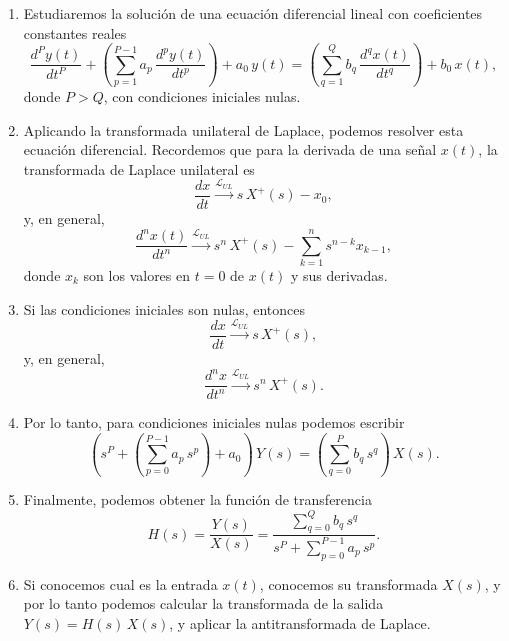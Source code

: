 \begin{enumerate}
	\item Estudiaremos la soluci\'{o}n de una ecuaci\'{o}n diferencial lineal con coeficientes constantes reales
	\begin{equation}
		\frac{d^{P}y\left( t\right) }{dt^{P}} +
		\left(\sum_{p=1}^{P-1}a_{p} \, \frac{d^{p}y\left( t\right) }{dt^{p}}\right) + a_{0} \, y(t)= 
		\left(\sum_{q=1}^{Q}b_{q} \, \frac{d^{q}x\left( t\right) }{dt^{q}}\right)  + b_{0} \, x(t),
	\end{equation}
	donde $P > Q$, con condiciones iniciales nulas.
	
	\item Aplicando la transformada unilateral de Laplace, podemos resolver esta ecuaci\'{o}n diferencial. Recordemos que para la derivada de una se\~{n}al $x(t)$, la transformada de Laplace unilateral es
	\begin{equation}
		\frac{dx}{dt} \xrightarrow{\mathcal{L}_{UL}} s \, X^{+}(s) - x_{0},
	\end{equation}
	y, en general,
	\begin{equation}
		\frac{d^{n}x(t)}{dt^{n}} \xrightarrow{\mathcal{L}_{UL}}
		s^{n} \, X^{+}(s) - \sum_{k=1}^{n} s^{n-k} x_{k-1},
	\end{equation}
	donde $x_{k}$ son los valores en $t = 0$ de $x(t)$ y sus derivadas.
	
	\item Si las condiciones iniciales son nulas, entonces
	\begin{equation}
		\frac{dx}{dt} \xrightarrow{\mathcal{L}_{UL}} s \, X^{+}(s),
	\end{equation}
	y, en general,
	\begin{equation}
		\frac{d^{n}x}{dt^{n}} \xrightarrow{\mathcal{L}_{UL}}
		s^{n} \, X^{+}(s).
	\end{equation}
	
	\item Por lo tanto, para condiciones iniciales nulas podemos escribir
	\begin{equation}
		\left(s^{P} + 
		\left(\sum_{p=0}^{P-1} a_{p} \, s^{p}\right) + a_{0} \right) \, Y(s) = 
		\left(\sum_{q=0}^{P} b_{q} \, s^{q} \right) \, X(s).
	\end{equation}
	
	\item Finalmente, podemos obtener la función de transferencia
	\begin{equation}
		H(s) = \frac{Y(s)}{X(s)} = 
		\frac{\sum_{q=0}^{Q} b_{q} \, s^{q}}{s^{P} + \sum_{p=0}^{P-1} a_{p} \, s^{p}}.
	\end{equation}
	
	\item Si conocemos cual es la entrada $x(t)$, conocemos su transformada $X(s)$, y por lo tanto podemos calcular la transformada de la salida $Y(s) = H(s) \, X(s)$, y aplicar la antitransformada de Laplace.
\end{enumerate}

